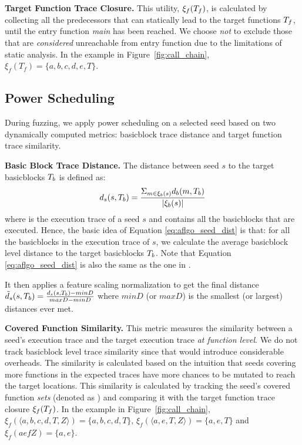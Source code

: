 \textbf{Target Function Trace Closure.} This utility, $\xi_f(T_f)$,  is calculated by collecting all the predecessors that can statically lead to the target functions $T_f$, until the entry function \emph{main} has been reached. We choose \emph{not} to exclude those that are \emph{considered} unreachable from entry function due to the limitations of static analysis. In the example in Figure~\ref{fig:call_chain}, $\xi_f(T_f)=\{a,b,c,d,e,T\}$.




\subsection{Power Scheduling}  \label{subsec:powerSche}

During fuzzing, we apply power scheduling on a selected seed based on two dynamically computed metrics: basicblock trace distance and target function trace similarity.

\textbf{Basic Block Trace Distance.} The distance between seed $s$ to the target basicblocks $T_b$ is defined as:
{\myeqsize\begin{equation}
d_s(s,T_b) = \frac{\Sigma_{m\in\xi_b(s)}d_b(m, T_b)}{|\xi_b(s)|}
\label{eq:aflgo_seed_dist}
\end{equation}}
where  is the execution trace of a seed $s$ and contains all the basicblocks that are executed. Hence, the basic idea of Equation  \ref{eq:aflgo_seed_dist} is that: for all the basicblocks in the  execution trace of $s$, we calculate the average basicblock level distance to the target basicblocks  $T_b$.  Note that Equation \ref{eq:aflgo_seed_dist} is also the same as the one in \aflgo \cite{Bohme:2017:DGF}.

It then applies a feature scaling normalization to get the final distance $\tilde{d}_s(s,T_b)=\frac{d_s(s,T_b)-minD}{maxD-minD}$ where $minD$ (or $maxD$) is the smallest (or largest) distances ever met.


\textbf{Covered Function Similarity.} This metric measures the similarity between a seed's execution trace and the target execution trace \emph{at function level}. We do not track basicblock level trace similarity since that would introduce considerable overheads. The similarity is calculated based on the intuition that seeds covering more functions in the expected traces have more chances to be mutated to reach the target locations. This similarity is calculated by tracking the seed's covered function \emph{sets} (denoted as ) and comparing it with the target function trace closure $\xi_f(T_f)$.  In the example in Figure~\ref{fig:call_chain}, $\xi_f(\langle a,b,c,d,T,Z\rangle)=\{a,b,c,d,T\}$, $\xi_f(\langle a,e,T,Z\rangle)=\{a,e,T\}$ and $\xi_f(aefZ)=\{a,e\}$.

